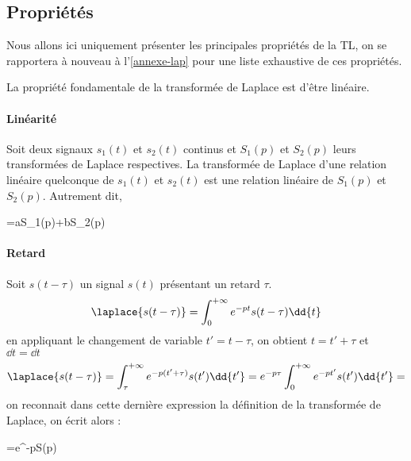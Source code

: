 \subsection{Propriétés}
Nous allons ici uniquement présenter les principales propriétés de la TL, 
on se rapportera à nouveau à l'\cref{annexe-lap} pour 
une liste exhaustive de ces propriétés.

La propriété fondamentale de la transformée de Laplace est d'être linéaire.
\paragraph{Linéarité}
Soit deux signaux $s_1(t)$ et $s_2(t)$ continus et $S_1(p)$ et $S_2(p)$ leurs
transformées de Laplace respectives. La transformée de Laplace d'une 
relation linéaire quelconque de $s_1(t)$ et $s_2(t)$ est une relation linéaire 
de $S_1(p)$ et $S_2(p)$. Autrement dit,
\begin{bequation}
	=aS_1(p)+bS_2(p)
\end{bequation}

\paragraph{Retard}
Soit $s(t-\tau)$ un signal $s(t)$ présentant un retard $\tau$.
$$
\laplace{s(t-\tau)}=\int_{0}^{+\infty} e^{-pt}s(t-\tau)\dd{t}
$$
en appliquant le changement de variable $t'=t-\tau$, on obtient $t=t'+\tau$ et $\dd{t}=\dd{t}$
$$
\laplace{s(t-\tau)}=\int_{\tau}^{+\infty} e^{-p(t'+\tau)}s(t')\dd{t'}=e^{-p\tau}\int_{0}^{+\infty} e^{-pt'}s(t')\dd{t'}=
$$
on reconnait dans cette dernière expression la définition de la transformée de Laplace, on écrit alors :
\begin{bequation}
    =e^{-p\tau}S(p)
\end{bequation}
